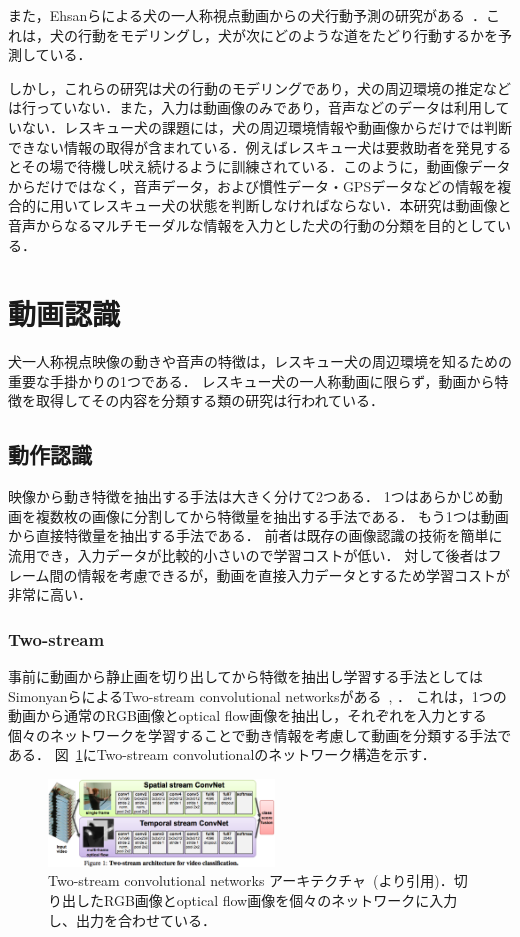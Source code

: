 また，Ehsanらによる犬の一人称視点動画からの犬行動予測の研究がある~\cite{whoretthedog}．これは，犬の行動をモデリングし，犬が次にどのような道をたどり行動するかを予測している．

しかし，これらの研究は犬の行動のモデリングであり，犬の周辺環境の推定などは行っていない．また，入力は動画像のみであり，音声などのデータは利用していない．レスキュー犬の課題には，犬の周辺環境情報や動画像からだけでは判断できない情報の取得が含まれている．例えばレスキュー犬は要救助者を発見するとその場で待機し吠え続けるように訓練されている．このように，動画像データからだけではなく，音声データ，および慣性データ・GPSデータなどの情報を複合的に用いてレスキュー犬の状態を判断しなければならない．本研究は動画像と音声からなるマルチモーダルな情報を入力とした犬の行動の分類を目的としている． 

\section{動画認識}
犬一人称視点映像の動きや音声の特徴は，レスキュー犬の周辺環境を知るための重要な手掛かりの1つである．
レスキュー犬の一人称動画に限らず，動画から特徴を取得してその内容を分類する類の研究は行われている．
\subsection{動作認識}
映像から動き特徴を抽出する手法は大きく分けて2つある．
1つはあらかじめ動画を複数枚の画像に分割してから特徴量を抽出する手法である．
もう1つは動画から直接特徴量を抽出する手法である．
前者は既存の画像認識の技術を簡単に流用でき，入力データが比較的小さいので学習コストが低い．
対して後者はフレーム間の情報を考慮できるが，動画を直接入力データとするため学習コストが非常に高い．
\subsubsection{Two-stream}
事前に動画から静止画を切り出してから特徴を抽出し学習する手法としてはSimonyanらによるTwo-stream convolutional networksがある~\cite{simonyan2014two}, \cite{wang2015towards}．
これは，1つの動画から通常のRGB画像とoptical flow画像を抽出し，それぞれを入力とする個々のネットワークを学習することで動き情報を考慮して動画を分類する手法である．
図~\ref{2st_network}にTwo-stream convolutionalのネットワーク構造を示す．
\begin{figure}[htbp]
 \begin{center}
  \includegraphics[width=6cm]{./Figures/two-stream.eps}
  \caption{Two-stream convolutional networks アーキテクチャ~(\cite{simonyan2014two}より引用)．切り出したRGB画像とoptical flow画像を個々のネットワークに入力し、出力を合わせている．}
  \label{2st_network}
 \end{center}
\end{figure}


